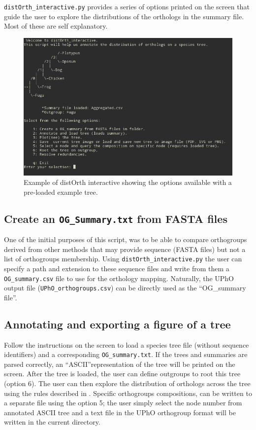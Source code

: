 \documentclass[10pt]{article}
\begin{document}
\texttt{distOrth\_interactive.py} provides a series of options printed on the screen that guide the user to explore the distributions of the orthologs in the summary file. Most of these are self explanatory.


\begin{figure}[t!]
\includegraphics[width=\textwidth]{distOrthmenu}
\caption{Example of distOrth interactive showing the options available with a pre-loaded example tree.}
\end{figure}

\subsection{Create an \texttt{OG\_Summary.txt} from FASTA files}
One of the initial purposes of this script, was to be
able to compare orthogroups derived from other methods that may
provide sequence (FASTA files) but not a list of orthogroups
membership. Using \texttt{distOrth\_interactive.py} the user can specify
a path and extension to these sequence files and write from them a
\texttt{OG\_summary.csv} file to use for the orthology
mapping. Naturally, the UPhO output file (\texttt{UPhO\_orthogroups.csv}) can be
directly used as the ``OG\_summary file''.


\subsection{Annotating and exporting a figure of a tree}
Follow the instructions on the screen to load a species tree file (without sequence identifiers) and a corresponding  \texttt{OG\_summary.txt}. If the trees and summaries are parsed correctly, an ``ASCII''representation of the tree will be printed on the screen. After the tree is loaded, the user can define outgroups to root this tree (option 6). The user can then explore the distribution of orthologs  across the tree using the rules  described in \citet{Ballesteros2016}. Specific orthogroups compositions, can be written to a separate file using the option 5; the user simply select the node number  from annotated ASCII tree and a text file in the UPhO orthogroup format will be written in the current directory. 
\end{document}
